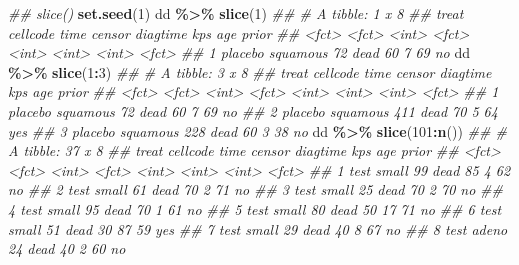 \documentclass[
]{book}
\newenvironment{Shaded}{\begin{snugshade}}{\end{snugshade}}
\newcommand{\CommentTok}[1]{\textcolor[rgb]{0.56,0.35,0.01}{\textit{#1}}}
\newcommand{\DecValTok}[1]{\textcolor[rgb]{0.00,0.00,0.81}{#1}}
\newcommand{\KeywordTok}[1]{\textcolor[rgb]{0.13,0.29,0.53}{\textbf{#1}}}
\newcommand{\NormalTok}[1]{#1}
\newcommand{\OperatorTok}[1]{\textcolor[rgb]{0.81,0.36,0.00}{\textbf{#1}}}
\newcommand{\StringTok}[1]{\textcolor[rgb]{0.31,0.60,0.02}{#1}}
\begin{document}
\begin{Shaded}
\begin{Highlighting}[]
\CommentTok{\#\# slice()}
\KeywordTok{set.seed}\NormalTok{(}\DecValTok{1}\NormalTok{)}
\NormalTok{dd }\OperatorTok{\%\textgreater{}\%}\StringTok{ }\KeywordTok{slice}\NormalTok{(}\DecValTok{1}\NormalTok{)}
\CommentTok{\#\# \# A tibble: 1 x 8}
\CommentTok{\#\#   treat   cellcode  time censor diagtime   kps   age prior}
\CommentTok{\#\#   \textless{}fct\textgreater{}   \textless{}fct\textgreater{}    \textless{}int\textgreater{} \textless{}fct\textgreater{}     \textless{}int\textgreater{} \textless{}int\textgreater{} \textless{}int\textgreater{} \textless{}fct\textgreater{}}
\CommentTok{\#\# 1 placebo squamous    72 dead         60     7    69 no}
\NormalTok{dd }\OperatorTok{\%\textgreater{}\%}\StringTok{ }\KeywordTok{slice}\NormalTok{(}\DecValTok{1}\OperatorTok{:}\DecValTok{3}\NormalTok{)}
\CommentTok{\#\# \# A tibble: 3 x 8}
\CommentTok{\#\#   treat   cellcode  time censor diagtime   kps   age prior}
\CommentTok{\#\#   \textless{}fct\textgreater{}   \textless{}fct\textgreater{}    \textless{}int\textgreater{} \textless{}fct\textgreater{}     \textless{}int\textgreater{} \textless{}int\textgreater{} \textless{}int\textgreater{} \textless{}fct\textgreater{}}
\CommentTok{\#\# 1 placebo squamous    72 dead         60     7    69 no   }
\CommentTok{\#\# 2 placebo squamous   411 dead         70     5    64 yes  }
\CommentTok{\#\# 3 placebo squamous   228 dead         60     3    38 no}
\NormalTok{dd }\OperatorTok{\%\textgreater{}\%}\StringTok{ }\KeywordTok{slice}\NormalTok{(}\DecValTok{101}\OperatorTok{:}\KeywordTok{n}\NormalTok{())}
\CommentTok{\#\# \# A tibble: 37 x 8}
\CommentTok{\#\#    treat cellcode  time censor   diagtime   kps   age prior}
\CommentTok{\#\#    \textless{}fct\textgreater{} \textless{}fct\textgreater{}    \textless{}int\textgreater{} \textless{}fct\textgreater{}       \textless{}int\textgreater{} \textless{}int\textgreater{} \textless{}int\textgreater{} \textless{}fct\textgreater{}}
\CommentTok{\#\#  1 test  small       99 dead           85     4    62 no   }
\CommentTok{\#\#  2 test  small       61 dead           70     2    71 no   }
\CommentTok{\#\#  3 test  small       25 dead           70     2    70 no   }
\CommentTok{\#\#  4 test  small       95 dead           70     1    61 no   }
\CommentTok{\#\#  5 test  small       80 dead           50    17    71 no   }
\CommentTok{\#\#  6 test  small       51 dead           30    87    59 yes  }
\CommentTok{\#\#  7 test  small       29 dead           40     8    67 no   }
\CommentTok{\#\#  8 test  adeno       24 dead           40     2    60 no   }

\end{Highlighting}
\end{Shaded}
\end{document}
